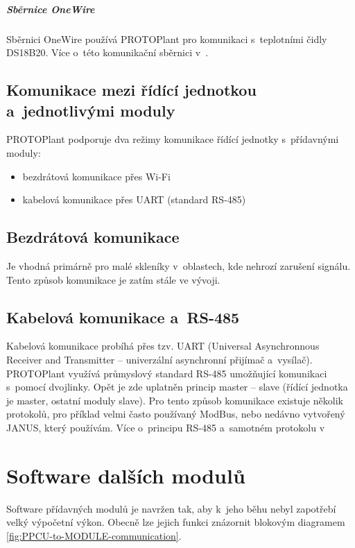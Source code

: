 \paragraph{Sběrnice OneWire}
Sběrnici OneWire používá PROTOPlant pro komunikaci s~teplotními čidly DS18B20. 
Více o~této komunikační sběrnici v~\cite{DS18B20}.

\section{Komunikace mezi řídící jednotkou a~jednotlivými moduly}
PROTOPlant podporuje dva režimy komunikace řídící jednotky s~přídavnými moduly:
\begin{itemize}
    \item bezdrátová komunikace přes Wi-Fi
    \item kabelová komunikace přes UART (standard RS-485)
\end{itemize}

\section{Bezdrátová komunikace}
Je vhodná primárně pro malé skleníky v~oblastech, kde nehrozí zarušení signálu.
Tento způsob komunikace je zatím stále ve vývoji.

\section{Kabelová komunikace a~RS-485}
Kabelová komunikace probíhá přes tzv. UART (Universal Asynchronnous Receiver and Transmitter -- univerzální asynchronní přijímač a~vysílač).
PROTO\-Plant využívá průmyslový standard RS-485 umožňující komunikaci s~pomocí dvojlinky.
Opět je zde uplatněn princip master -- slave (řídící jednotka je master, ostatní moduly slave).
Pro tento způsob komunikace existuje několik protokolů, pro příklad velmi často používaný ModBus, nebo nedávno vytvořený JANUS\cite{JANUS}, který používám. 
Více o~principu RS-485 a~samotném protokolu v~\cite[21-25]{JANUS}

\chapter{Software dalších modulů}

\label{chap:moduleSoftware}
Software přídavných modulů je navržen tak, aby k~jeho běhu nebyl zapotřebí velký výpočetní výkon.
Obecně lze jejich funkci znázornit blokovým diagramem \ref{fig:PPCU-to-MODULE-communication}.

